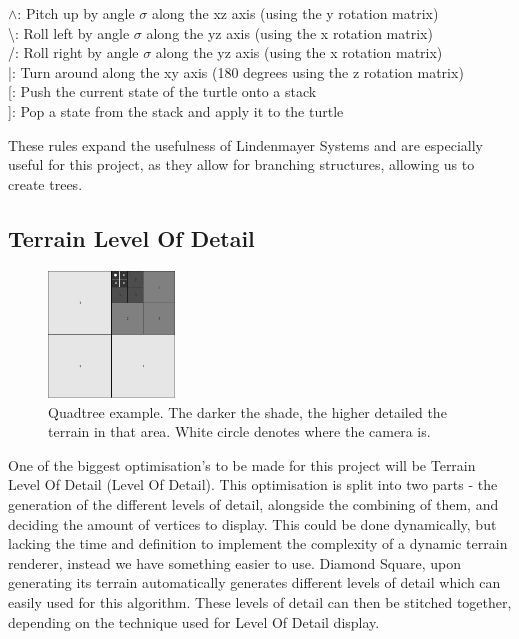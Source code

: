 \documentclass[a4paper,10pt]{report}
\begin{document}
\setlength{\parindent}{1cm}$\wedge$: Pitch up by angle $\sigma$ along the xz axis (using the y rotation matrix)\\


\setlength{\parindent}{1cm}\textbackslash: Roll left by angle $\sigma$ along the yz axis (using the x rotation matrix)\\


\setlength{\parindent}{1cm}/: Roll right by angle $\sigma$ along the yz axis (using the x rotation matrix)\\


\setlength{\parindent}{1cm}|: Turn around along the xy axis (180 degrees using the z rotation matrix)\\


\setlength{\parindent}{1cm}[: Push the current state of the turtle onto a stack\\


\setlength{\parindent}{1cm}]: Pop a state from the stack and apply it to the turtle\medskip


\setlength{\parindent}{0pt}These rules expand the usefulness of Lindenmayer Systems and are especially useful for this project, as they allow for branching structures, allowing us to create trees.

\subsection{Terrain Level Of Detail}

\begin{figure}[h!]
    \centering
  \includegraphics[width=0.3\textwidth]{Images/Charts/QuadTree.png}
 \caption{Quadtree example. The darker the shade, the higher detailed the terrain in that area. White circle denotes where the camera is.}
 \label{fig:quad_tree}
\end{figure}

One of the biggest optimisation's to be made for this project will be Terrain Level Of Detail (Level Of Detail). This optimisation is split into two parts - the generation of the different levels of detail, alongside the combining of them, and deciding the amount of vertices to display. This could be done dynamically, but lacking the time and definition  to implement the complexity of a dynamic terrain renderer, instead we have something easier to use. Diamond Square, upon generating its terrain automatically generates different levels of detail which can easily used for this algorithm. These levels of detail can then be stitched together, depending on the technique used for Level Of Detail display. \medskip
\end{document}
